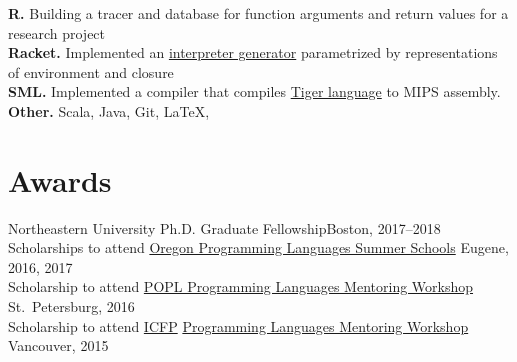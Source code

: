 \documentclass[margin,line]{resume}
\begin{document}
\begin{resume}
    \textbf{R.} Building a tracer and database for function arguments and return values for a research project\\[\mymedskip]
    \textbf{Racket.} Implemented an \href{https://github.com/hyeyoungshin/hy_eopl}{interpreter generator} parametrized by representations of environment and closure\\[\mymedskip]
    \textbf{SML.} Implemented a compiler that compiles \href{https://www.cs.princeton.edu/~appel/modern/ml/}{Tiger language} to MIPS assembly.\\[\mymedskip]
    \textbf{Other.} Scala, Java, Git, \LaTeX, 

    \section{\mysidestyle Awards} 

    Northeastern University Ph.D. Graduate Fellowship\hfill Boston, 2017--2018\\[\mymedskip]
    Scholarships to attend
    \href{https://www.cs.uoregon.edu/research/summerschool/summer17}
    {Oregon Programming Languages Summer Schools} \hfill %
    Eugene, 2016, 2017\\[\mymedskip]
    Scholarship to attend 
     \href{http://conf.researchr.org/home/PLMW-2016}{POPL
        Programming Languages Mentoring Workshop} \hfill St.~Petersburg, 2016\\[\mymedskip]
            Scholarship to attend
           \href{http://icfpconference.org/icfp2015/}{ICFP}
           \href{https://www.cis.upenn.edu/~sweirich/icfp-plmw15/}
                {Programming Languages Mentoring Workshop}
\hfill         Vancouver, %
2015



\end{resume}
\end{document}
